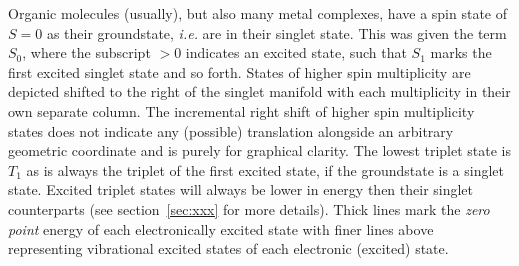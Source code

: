 		Organic molecules (usually), but also many metal complexes, have a spin state of $S = 0$ as their groundstate, \textit{i.e.} are in their singlet state. This was given the term $S_0$, where the subscript $> 0$ indicates an excited state, such that $S_1$ marks the first excited singlet state and so forth. States of higher spin multiplicity are depicted shifted to the right of the singlet manifold with each multiplicity in their own separate column. The incremental right shift of higher spin multiplicity states does not indicate any (possible) translation alongside an arbitrary geometric coordinate and is purely for graphical clarity. The lowest triplet state is $T_1$ as is always the triplet of the first excited state, if the groundstate is a singlet state. Excited triplet states will always be lower in energy then their singlet counterparts (see section~\ref{sec:xxx} for more details). Thick lines mark the \emph{zero point} energy of each electronically excited state with finer lines above representing vibrational excited states of each electronic (excited) state. 

